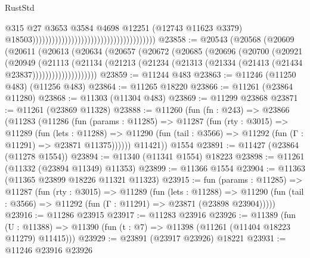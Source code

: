 \begin{lexlean}{RustStd}
\begin{coremodule}
                                                                                @315
                                                                                @27
                                                                                @3653
                                                                                @3584
                                                                                @4698
                                                                                @12251
                                                                                (@12743
                                                                                  @11623
                                                                                  @3379)
                                                                                @18503))))))))))))))))))))))))))))))))))))))
@23858 := @20543
    (@20568
      (@20609
        (@20611
          (@20613
            (@20634
              (@20657
                (@20672
                  (@20685
                    (@20696
                      (@20700
                        (@20921
                          (@20949
                            (@21113
                              (@21134
                                (@21213
                                  (@21234 (@21313 (@21334 (@21413 (@21434 @23837))))))))))))))))))))
@23859 := @11244 @483
@23863 := @11246 (@11250 @483) (@11256 @483)
@23864 := @11265 @18220
@23866 := @11261 (@23864 @11280)
@23868 := @11303 (@11304 @483)
@23869 := @11299 @23868
@23871 := @11261 (@23869 @11328)
@23888 := @11260
    (fun (fn : @243) =>
    @23866
      (@11283
        (@11286
          (fun (params : @11285) =>
          @11287
            (fun (rty : @3015) =>
            @11289
              (fun (lets : @11288) =>
              @11290 (fun (tail : @3566) => @11292 (fun (Γ : @11291) => @23871 @11375))))))
        @11421))
    @1554
@23891 := @11427 (@23864 (@11278 @1554))
@23894 := @11340 (@11341 @1554) @18223
@23898 := @11261 (@11332 (@23894 @11349) @11353)
@23899 := @11366 @1554
@23904 := @11363 (@11365 @23899 @18226 @11321 @11323)
@23915 := fun (params : @11285) =>
  @11287
    (fun (rty : @3015) =>
    @11289
      (fun (lets : @11288) =>
      @11290 (fun (tail : @3566) => @11292 (fun (Γ : @11291) => @23871 (@23898 @23904)))))
@23916 := @11286 @23915
@23917 := @11283 @23916
@23926 := @11389
    (fun (U : @11388) => @11390 (fun (t : @7) => @11398 (@11261 (@11404 @18223 @11279) @11415)))
@23929 := @23891 (@23917 @23926) @18221
@23931 := @11246 @23916 @23926

\end{coremodule}
\end{lexlean}
